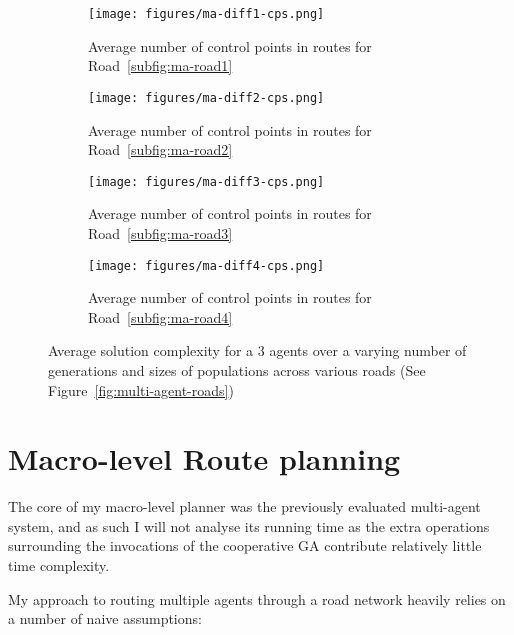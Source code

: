 \begin{figure}
  \centering
  \begin{subfigure}[b]{0.44\textwidth}
    \centering
    \texttt{[image: figures/ma-diff1-cps.png]}
    \caption{\label{subfig:ma-diff1-cps}Average number of control points in routes for Road~\ref{subfig:ma-road1}}
  \end{subfigure}
  \begin{subfigure}[b]{0.44\textwidth}
    \centering
    \texttt{[image: figures/ma-diff2-cps.png]}
    \caption{\label{subfig:ma-diff2-cps}Average number of control points in routes for Road~\ref{subfig:ma-road2}}
  \end{subfigure}
  \begin{subfigure}[b]{0.44\textwidth}
    \centering
    \texttt{[image: figures/ma-diff3-cps.png]}
    \caption{\label{subfig:ma-diff3-cps}Average number of control points in routes for Road~\ref{subfig:ma-road3}}
  \end{subfigure}
  \begin{subfigure}[b]{0.44\textwidth}
    \centering
    \texttt{[image: figures/ma-diff4-cps.png]}
    \caption{\label{subfig:ma-diff4-cps}Average number of control points in routes for Road~\ref{subfig:ma-road4}}
  \end{subfigure}
  \caption{\label{fig:multi-agent-cps} Average solution complexity for a 3 agents over a varying number of generations and sizes of populations across various roads (See Figure~\ref{fig:multi-agent-roads}) }
\end{figure}

\section{Macro-level Route planning}

The core of my macro-level planner was the previously evaluated multi-agent system, and as such I will not analyse its running time as the extra operations surrounding the invocations of the cooperative GA contribute relatively little time complexity.

My approach to routing multiple agents through a road network heavily relies on a number of naive assumptions:

